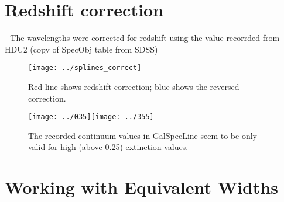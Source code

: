 \documentclass[12pt]{article}
\begin{document}
\section{Redshift correction}
- The wavelengths were corrected for redshift using the value recorrded from HDU2 (copy of SpecObj table from SDSS)\\
\begin{figure}
\texttt{[image: ../splines\_correct]}\\
\caption{Red line shows redshift correction; blue shows the reversed correction.}
\end{figure}

\begin{figure}
\texttt{[image: ../035]}\texttt{[image: ../355]}\\
\caption{The recorded continuum values in GalSpecLine seem to be only valid for high (above 0.25) extinction values.}
\end{figure}
\section{Working with Equivalent Widths}
\end{document}
